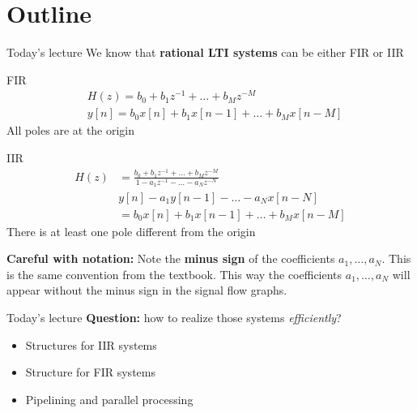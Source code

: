 \documentclass[10pt, handout]{beamer}
\begin{document}
\section{Outline}
%
\begin{frame}{Today's lecture}
We know that \textbf{rational LTI systems} can be either FIR or IIR
\begin{block}{FIR}
	\vspace{-0.5cm}
	\begin{align}
		&H(z) =  b_0 + b_1z^{-1} + \ldots + b_Mz^{-M} \tag{$z$-transform} \\
		&y[n] = b_0x[n] + b_1x[n-1] + \ldots + b_Mx[n-M] \tag{difference equation}
	\end{align}
	All poles are at the origin
\end{block}

\begin{block}{IIR}
	\vspace{-0.5cm}
	\begin{align*}
	H(z) &=  \frac{b_0 + b_1z^{-1} + \ldots + b_Mz^{-M}}{1 - a_1z^{-1} - \ldots - a_Nz^{-N}} \tag{$z$-transform} \\
	&y[n] - a_1y[n-1] - \ldots - a_Nx[n-N]  \\
	&= b_0x[n] + b_1x[n-1] + \ldots + b_Mx[n-M] \tag{difference equation}
	\end{align*}
	There is at least one pole different from the origin
	
	\textbf{Careful with notation:} Note the \textbf{minus sign} of the coefficients $a_1, \ldots, a_N$. This is the same convention from the textbook. This way the coefficients $a_1, \ldots, a_N$ will appear without the minus sign in the signal flow graphs.
\end{block}

\end{frame}

%
\begin{frame}{Today's lecture}
	\textbf{Question:} how to realize those systems \textit{efficiently}?
	
	\begin{itemize}
		\item Structures for IIR systems
		\item Structure for FIR systems
		\item Pipelining and parallel processing
	\end{itemize}
\end{frame}

%
\end{document}
